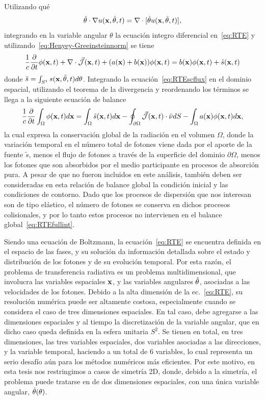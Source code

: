Utilizando qué
\begin{equation}
\hat{\theta} \cdot \nabla u(\mathbf{x},\hat{\theta},t)=\nabla \cdot [\hat{\theta} u(\mathbf{x},\hat{\theta},t)],
\label{eq:scdiv}
\end{equation}
integrando en la variable angular $\theta$
 la ecuación integro diferencial en~\eqref{eq:RTE} y utilizando~\eqref{eq:Henyey-Greeinsteinnorm}  se tiene
\begin{equation}
\frac{1}{c}\frac{\partial}{\partial t} \phi(\mathbf{x},t)+\nabla \cdot \vec{ \mathcal{J}}(\mathbf{x},t)
+(a(\mathbf{x})+b(\mathbf{x})) \phi(\mathbf{x},t)=b(\mathbf{x})\phi(\mathbf{x},t)+\tilde{s}(\mathbf{x},t)
\label{eq:RTEscflux}
\end{equation}
donde $\tilde{s}=\int_{S^1}s(\mathbf{x},\hat{\theta},t)d\theta$. Integrando la 
ecuación~\eqref{eq:RTEscflux} en el dominio espacial, utilizando el teorema de la divergencia
y reordenando los términos se llega a la siguiente ecuación de balance
\begin{equation}
\frac{1}{c}\frac{\partial}{\partial t} \int_{\Omega}\phi(\mathbf{x},t)d\mathbf{x} = 
\int_{\Omega}\tilde{s}(\mathbf{x},t)d\mathbf{x}- \oint_{\partial \Omega} \vec{ \mathcal{J}}(\mathbf{x},t)\cdot \hat{\nu} dS-\int_{\Omega}a(\mathbf{x})\phi(\mathbf{x},t)d\mathbf{x},
\label{eq:RTEfullint}
\end{equation}
la cual expresa la conservación global de la radiación en el volumen $\Omega$, 
donde la variación temporal en el número total de fotones 
viene dada por el aporte de la fuente $\tilde{s}$, menos el flujo de fotones
 a través de la superficie del 
dominio $\partial \Omega$, menos los fotones que son absorbidos 
por el medio participante en procesos de absorción pura. 
A pesar de que no fueron incluidos en este análisis, 
también deben ser consideradas en esta relación de balance global la condición inicial y las 
condiciones de contorno. Dado que 
los procesos de dispersión que nos interesan son de tipo elástico, el número 
de fotones se conserva en dichos procesos colisionales, y por lo tanto 
estos procesos no intervienen en el balance global~\eqref{eq:RTEfullint}. 

Siendo una ecuación de Boltzmann, la ecuación~\eqref{eq:RTE} 
se encuentra definida en el espacio de las fases, 
y su solución da información detallada sobre el estado y distribución 
de los fotones y de su evolución temporal.   Por esta razón, 
el problema de transferencia radiativa es un problema multidimensional, 
que involucra las variables espaciales $\mathbf{x}$, y las variables angulares 
$\hat{\theta}$, asociadas a las velocidades de los fotones. 
Debido a la alta dimensión de la ec.~\eqref{eq:RTE}, su resolución numérica 
puede ser altamente costosa, especialmente cuando se considera el caso de 
tres dimensiones espaciales. En tal caso, debe agregarse a las dimensiones 
espaciales y al tiempo la discretización de la variable angular, 
que en dicho caso queda definida en la esfera unitaria $S^2$. 
Se tienen en total, en tres dimensiones, las tres variables espaciales, 
dos variables asociadas a las direcciones, y la variable temporal, haciendo 
a un total de 6 variables, lo cual representa un serio desafío 
aún para los métodos numéricos más eficientes. 
Por este motivo, en esta tesis nos restringimos a casos de 
simetría 2D, donde, debido a la simetría, el 
problema puede tratarse en de dos dimensiones espaciales, 
con una única variable angular, $\hat{\theta}(\theta)$.


